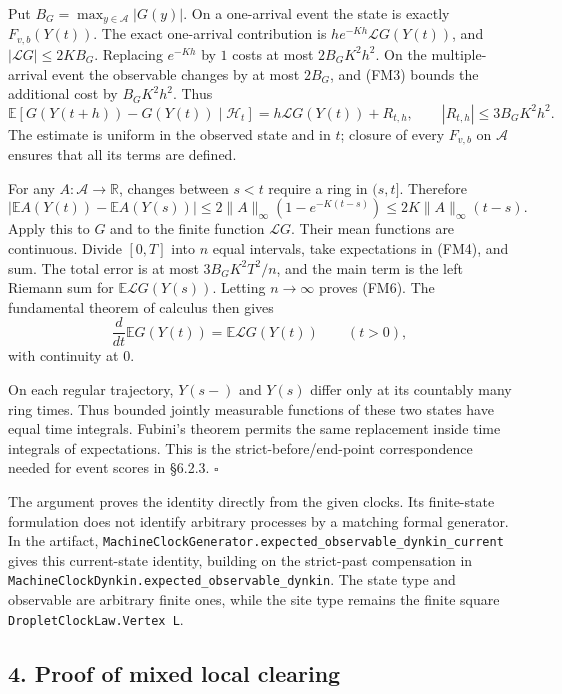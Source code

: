 \documentclass[
  11pt,
  a4paper,
]{article}
\begin{document}
Put \(B_G=\max_{y\in\mathcal A}|G(y)|\). On a one-arrival event the
state is exactly \(F_{v,b}(Y(t))\). The exact one-arrival contribution
is \(he^{-Kh}\mathcal LG(Y(t))\), and \(|\mathcal LG|\leq2KB_G\).
Replacing \(e^{-Kh}\) by \(1\) costs at most \(2B_GK^2h^2\). On the
multiple-arrival event the observable changes by at most \(2B_G\), and
(FM3) bounds the additional cost by \(B_GK^2h^2\). Thus \[
\mathbb E[G(Y(t+h))-G(Y(t))\mid\mathcal H_t]
=h\mathcal LG(Y(t))+R_{t,h},
\qquad |R_{t,h}|\leq3B_GK^2h^2.
\tag{FM4}
\] The estimate is uniform in the observed state and in \(t\); closure
of every \(F_{v,b}\) on \(\mathcal A\) ensures that all its terms are
defined.

For any \(A:\mathcal A\to\mathbb R\), changes between \(s<t\) require a
ring in \((s,t]\). Therefore \[
|\mathbb E A(Y(t))-\mathbb E A(Y(s))|
\leq2\|A\|_\infty(1-e^{-K(t-s)})
\leq2K\|A\|_\infty(t-s).
\tag{FM5}
\] Apply this to \(G\) and to the finite function \(\mathcal LG\). Their
mean functions are continuous. Divide \([0,T]\) into \(n\) equal
intervals, take expectations in (FM4), and sum. The total error is at
most \(3B_GK^2T^2/n\), and the main term is the left Riemann sum for
\(\mathbb E\mathcal LG(Y(s))\). Letting \(n\to\infty\) proves (FM6). The
fundamental theorem of calculus then gives \[
\frac d{dt}\mathbb E G(Y(t))
=\mathbb E\mathcal LG(Y(t))\qquad(t>0),
\tag{FM7}
\] with continuity at \(0\).

On each regular trajectory, \(Y(s-)\) and \(Y(s)\) differ only at its
countably many ring times. Thus bounded jointly measurable functions of
these two states have equal time integrals. Fubini's theorem permits the
same replacement inside time integrals of expectations. This is the
strict-before/end-point correspondence needed for event scores in
§6.2.3. \(\square\)

The argument proves the identity directly from the given clocks. Its
finite-state formulation does not identify arbitrary processes by a
matching formal generator. In the artifact,
\texttt{MachineClockGenerator.expected\_\allowbreak observable\_\allowbreak dynkin\_\allowbreak current}
gives this current-state identity, building on the strict-past
compensation in
\texttt{MachineClockDynkin.expected\_\allowbreak observable\_\allowbreak dynkin}. The state type
and observable are arbitrary finite ones, while the site type remains
the finite square \texttt{DropletClockLaw.Vertex\ L}.

\subsection{4. Proof of mixed local
clearing}\label{proof-of-mixed-local-clearing}
\end{document}
